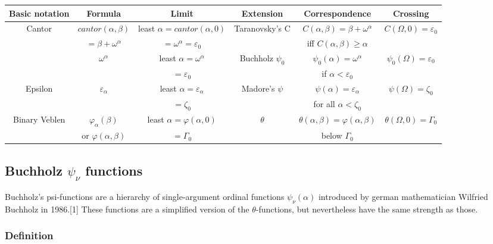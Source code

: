 \documentclass[10pt]{article}
\begin{document}
\begin{tabular}{|c|c|c|c|c|c|} \hline
Basic notation	& Formula			& Limit					& Extension		& Correspondence					& Crossing 				\\ \hline
Cantor		& \( cantor(\alpha,\beta) \)	& least \( \alpha = cantor(\alpha,0) \)	& Taranovsky's C	& \( C(\alpha,\beta) = \beta+\omega^\alpha \)		& \( C(\Omega,0) = \varepsilon_0 \)	\\
		& \( = \beta + \omega^\alpha \)	& \( = \omega^\alpha = \varepsilon_0 \)	&			& iff \( C(\alpha,\beta) \geq \alpha \)			&					\\ \hline
		& \( \omega^\alpha \)		& least \( \alpha = \omega^\alpha \)	& Buchholz \( \psi_0 \) & \( \psi_0(\alpha) = \omega^\alpha \)			& \( \psi_0(\Omega) = \varepsilon_0 \)	\\
		&				& \( = \varepsilon_0 \)			&			& if \( \alpha < \varepsilon_0 \)			&					\\ \hline
Epsilon		& \( \varepsilon_\alpha	\)	& least \( \alpha = \varepsilon_\alpha\)& Madore's \( \psi \)	& \( \psi(\alpha) = \varepsilon_\alpha \)		& \( \psi(\Omega) = \zeta_0 \)		\\
		&				& \( = \zeta_0 \)			&			& for all \( \alpha < \zeta_0 \)			& 					\\ \hline
Binary Veblen	& \( \varphi_\alpha(\beta) \)	& least \( \alpha = \varphi(\alpha,0) \)& \( \theta \)		& \( \theta(\alpha,\beta) = \varphi(\alpha,\beta) \)	& \( \theta(\Omega,0) = \Gamma_0 \)	\\
		& or \( \varphi(\alpha,\beta) \)& \( = \Gamma_0 \)			&			& below \( \Gamma_0 \)					&					\\ \hline
													
\end{tabular}

\subsection{Buchholz \( \psi_\nu \) functions}

Buchholz's psi-functions are a hierarchy of single-argument ordinal functions \(\psi_\nu(\alpha)\) introduced by german mathematician Wilfried Buchholz in 1986.[1] These functions are a simplified version of the \(\theta\)-functions, but nevertheless have the same strength as those.

\subsubsection{Definition}
\end{document}
